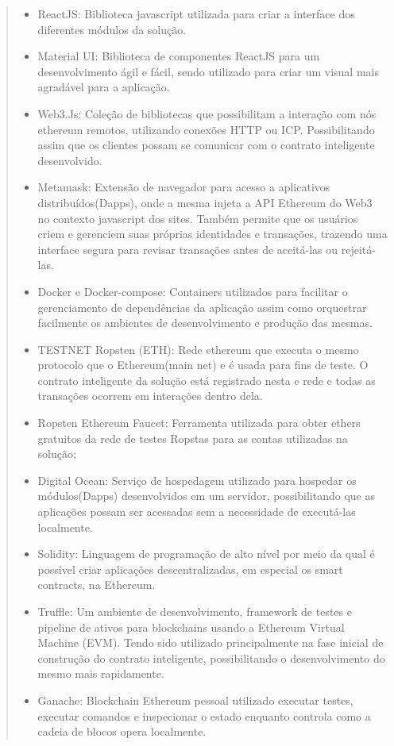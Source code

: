     \begin{quote}
    \begin{itemize}
        \item ReactJS: Biblioteca javascript utilizada para criar a interface dos diferentes módulos da solução.
        \item Material UI: Biblioteca de componentes ReactJS para um desenvolvimento ágil e fácil, sendo utilizado para criar um visual mais agradável para a aplicação.
        \item Web3.Js: Coleção de bibliotecas que possibilitam a interação com nós ethereum remotos, utilizando conexões HTTP ou ICP. Possibilitando assim que os clientes possam se comunicar com o contrato inteligente desenvolvido.
        \item Metamask: Extensão de navegador para acesso a aplicativos distribuídos(Dapps), onde a mesma injeta a API Ethereum do Web3 no contexto javascript dos sites. Também permite que os usuários criem e gerenciem suas próprias identidades e transações, trazendo uma interface segura para revisar transações antes de aceitá-las ou rejeitá-las.
        \item Docker e Docker-compose: Containers utilizados para facilitar o gerenciamento de dependências da aplicação assim como orquestrar facilmente os ambientes de desenvolvimento e produção das mesmas.
        \item TESTNET Ropsten (ETH): Rede ethereum que executa o mesmo protocolo que o Ethereum(main net) e é usada para fins de teste. O contrato inteligente da solução está registrado nesta e rede e todas as transações ocorrem em interações dentro dela.
        \item Ropsten Ethereum Faucet: Ferramenta utilizada para obter ethers gratuitos da rede de testes Ropstas para as contas utilizadas na solução;
        \item Digital Ocean: Serviço de hospedagem utilizado para hospedar os módulos(Dapps) desenvolvidos em um servidor, possibilitando que as aplicações possam ser acessadas sem a necessidade de executá-las localmente.
        \item Solidity: Linguagem de programação de alto nível por meio da qual é possível criar aplicações descentralizadas, em especial os smart contracts, na Ethereum. 
        \item Truffle: Um ambiente de desenvolvimento, framework de testes e pipeline de ativos para blockchains usando a Ethereum Virtual Machine (EVM). Tendo sido utilizado principalmente na fase inicial de construção do contrato inteligente, possibilitando o desenvolvimento do mesmo mais rapidamente.
        \item Ganache: Blockchain Ethereum pessoal utilizado executar testes, executar comandos e inspecionar o estado enquanto controla como a cadeia de blocos opera localmente.
    \end{itemize}
    \end{quote}
        
